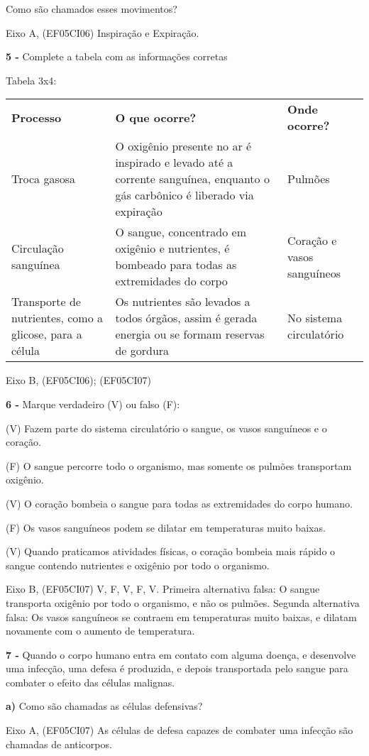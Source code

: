 Como são chamados esses movimentos?

Eixo A, (EF05CI06) Inspiração e Expiração.

\textbf{5 -} Complete a tabela com as informações corretas

Tabela 3x4:

\begin{longtable}[]{@{}lll@{}}
\toprule
\textbf{Processo} & \textbf{O que ocorre?} & \textbf{Onde
ocorre?}\tabularnewline
Troca gasosa & O oxigênio presente no ar é inspirado e levado até a
corrente sanguínea, enquanto o gás carbônico é liberado via expiração &
Pulmões\tabularnewline
Circulação sanguínea & O sangue, concentrado em oxigênio e nutrientes, é
bombeado para todas as extremidades do corpo & Coração e vasos
sanguíneos\tabularnewline
Transporte de nutrientes, como a glicose, para a célula & Os nutrientes
são levados a todos órgãos, assim é gerada energia ou se formam reservas
de gordura & No sistema circulatório\tabularnewline
\bottomrule
\end{longtable}

Eixo B, (EF05CI06); (EF05CI07)

\textbf{6 -} Marque verdadeiro (V) ou falso (F):

(V) Fazem parte do sistema circulatório o sangue, os vasos sanguíneos e
o coração.

(F) O sangue percorre todo o organismo, mas somente os pulmões
transportam oxigênio.

(V) O coração bombeia o sangue para todas as extremidades do corpo
humano.

(F) Os vasos sanguíneos podem se dilatar em temperaturas muito baixas.

(V) Quando praticamos atividades físicas, o coração bombeia mais rápido
o sangue contendo nutrientes e oxigênio por todo o organismo.

Eixo B, (EF05CI07) V, F, V, F, V. Primeira alternativa falsa: O sangue
transporta oxigênio por todo o organismo, e não os pulmões. Segunda
alternativa falsa: Os vasos sanguíneos se contraem em temperaturas muito
baixas, e dilatam novamente com o aumento de temperatura.

\textbf{7 -} Quando o corpo humano entra em contato com alguma doença, e
desenvolve uma infecção, uma defesa é produzida, e depois transportada
pelo sangue para combater o efeito das células malignas.

\textbf{a)} Como são chamadas as células defensivas?

Eixo A, (EF05CI07) As células de defesa capazes de combater uma infecção
são chamadas de anticorpos.

